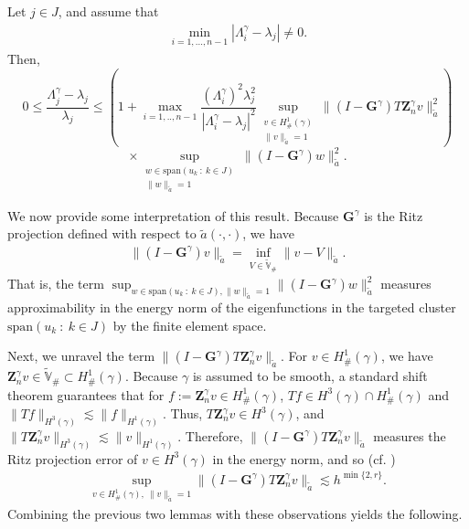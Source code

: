 \documentclass{siamart0516}
\newcommand{\bG}{\ensuremath{\boldsymbol G}}
\newcommand{\bZ}{\ensuremath{\boldsymbol Z}}
\numberwithin{equation}{section}
\numberwithin{theorem}{section}
\numberwithin{figure}{section}
\begin{document}
\begin{lemma}
Let $j \in J$, and assume that 
\begin{align}
\min_{i=1,..., n-1} |\Lambda_{i}^\gamma-\lambda_j| \neq 0.
\end{align}
Then,
\begin{equation*}
0 \le \frac{\Lambda^\gamma_{j} - \lambda_j}{\lambda_j}  \le \left ( 1 + \max_{i=1,.., n-1} \frac{(\Lambda^\gamma_{i})^2 \lambda_j^2}{|\Lambda^\gamma_{i}-\lambda_j|^2} \sup_{\substack{v \in H^1_\# (\gamma)\\ \| v \|_{\tilde a}=1}} \|(I-{\bG}^\gamma) T \bZ^\gamma_n v \|_{\tilde a}^2 \right ) 
\end{equation*}
$$
\times\sup_{\substack{w \in \textrm{span}(u_k \ : \ k \in J)\\ \|w\|_{\tilde a}=1} } \|(I-\bG^\gamma)w\|_{\tilde a}^2.
$$
\end{lemma}  

We now provide some interpretation of this result.  
Because $\bG^\gamma$ is the Ritz projection defined with respect to $\tilde a(\cdot, \cdot)$, we have
\begin{align}
\|(I-\bG^\gamma) v\|_{\tilde a} = \inf_{V \in \widetilde{\mathbb{V}}_\#} \|v-V\|_{\tilde a}. 
\end{align}
That is, the term $\sup_{w \in \textrm{span}(u_k \ : \ k \in J), \|w\|_{\tilde a}=1 } \|(I-\bG^\gamma)w\|_{\tilde a}^2$ measures approximability in the energy norm of the eigenfunctions in the targeted cluster $ \textrm{span}(u_k \ : \ k \in J)$ by the finite element space.  

Next, we unravel the term $\|(I-{\bG}^\gamma) T \bZ^\gamma_n v \|_{\tilde a}$.  For $v \in H^1_\#(\gamma)$, we have $\bZ^\gamma_n v \in \widetilde{\mathbb V}_\# \subset H^1_\#(\gamma)$.   Because $\gamma$ is assumed to be smooth, a standard shift theorem guarantees that for $f:=\bZ^\gamma_n v \in H^1_\#(\gamma)$, $Tf \in H^3(\gamma) \cap H^1_\#(\gamma)$ and $\|Tf\|_{H^{3}(\gamma)} \lesssim \|f\|_{H^1(\gamma)}$.  
Thus, $T \bZ^\gamma_n v \in H^3(\gamma)$, and $\|T {\bZ}^\gamma_n v\|_{H^3(\gamma)} \lesssim \| v \|_{H^1(\gamma)}$. 
Therefore, $\|(I-\bG^\gamma) T \bZ^\gamma_n v \|_{\tilde a}$ measures the Ritz projection error of $v \in H^3(\gamma)$ in the energy norm, and so (cf. \cite{D09})
\begin{align}
\sup_{v \in H^1_\# (\gamma), \ \| v \|_{\tilde a}=1} \|(I-{\bG}^\gamma) T \bZ^\gamma_n v \|_{\tilde a} \lesssim h^{\min\{2,r\}}.
\end{align}
Combining the previous two lemmas with these observations yields the following.  
\end{document}
